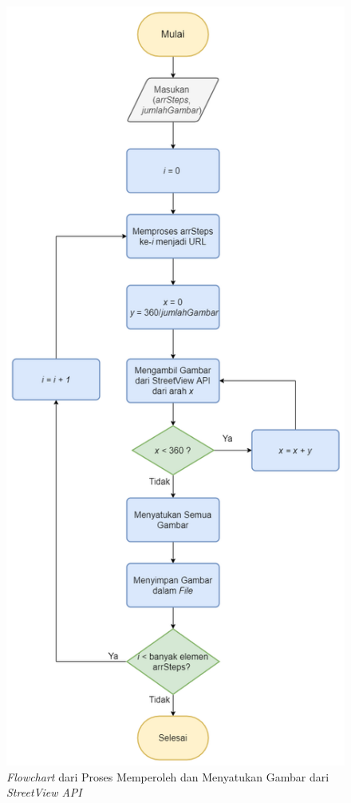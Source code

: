 \begin{figure}[h]
	\centering
		\includegraphics[scale=0.5]{Gambar/streetview-flowchart.png}
	\caption{\textit{Flowchart} dari Proses Memperoleh dan Menyatukan Gambar dari \textit{StreetView API}}
	\label{fig:streetview-flowchart}
\end{figure}

